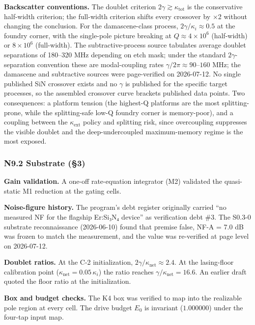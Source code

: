 \documentclass[
  10pt,
]{article}
\begin{document}
\textbf{Backscatter conventions.} The doublet criterion
\(2\gamma \gtrsim \kappa_\mathrm{tot}\) is the conservative half-width
criterion; the full-width criterion shifts every crossover by ×2 without
changing the conclusion. For the damascene-class process,
\(2\gamma/\kappa_i \approx 0.5\) at the foundry corner, with the
single-pole picture breaking at \(Q \approx 4\times10^6\) (half-width)
or \(8\times10^6\) (full-width). The subtractive-process source
tabulates average doublet separations of 180--320 MHz depending on etch
mask; under the standard \(2\gamma\)-separation convention these are
modal-coupling rates \(\gamma/2\pi \approx 90\)--\(160\) MHz; the
damascene and subtractive sources were page-verified on 2026-07-12. No
single published SiN crossover exists and no \(\gamma\) is published for
the specific target processes, so the assembled crossover curve brackets
published data points. Two consequences: a platform tension (the
highest-Q platforms are the most splitting-prone, while the
splitting-safe low-Q foundry corner is memory-poor), and a coupling
between the \(\kappa_\mathrm{ext}\) policy and splitting risk, since
overcoupling suppresses the visible doublet and the deep-undercoupled
maximum-memory regime is the most exposed.

\subsubsection{N9.2 Substrate (§3)}\label{n9.2-substrate-3}

\textbf{Gain validation.} A one-off rate-equation integrator (M2)
validated the quasi-static M1 reduction at the gating cells.

\textbf{Noise-figure history.} The program's debt register originally
carried ``no measured NF for the flagship Er:Si₃N₄ device'' as
verification debt \#3. The S0.3-0 substrate reconnaissance (2026-06-10)
found that premise false, NF-A = 7.0 dB was frozen to match the
measurement, and the value was re-verified at page level on 2026-07-12.

\textbf{Doublet ratios.} At the C-2 initialization,
\(2\gamma/\kappa_\text{net} \approx 2.4\). At the lasing-floor
calibration point (\(\kappa_\text{net} = 0.05\,\kappa_i\)) the ratio
reaches \(\gamma/\kappa_\text{net} = 16.6\). An earlier draft quoted the
floor ratio at the initialization.

\textbf{Box and budget checks.} The K4 box was verified to map into the
realizable pole region at every cell. The drive budget \(E_0\) is
invariant (\(1.000000\)) under the four-tap input map.
\end{document}
